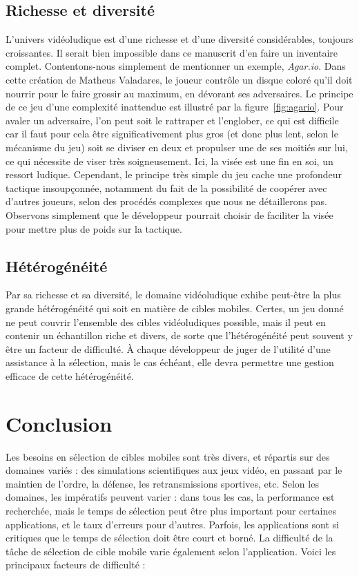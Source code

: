 	\subsection{Richesse et diversité}
	\label{sub:rich}
	L'univers vidéoludique est d'une richesse et d'une diversité considérables, toujours croissantes. Il serait bien impossible dans ce manuscrit d'en faire un inventaire complet. Contentons-nous simplement de mentionner un exemple, \emph{Agar.io}. Dans cette création de Matheus Valadares, le joueur contrôle un disque coloré qu'il doit nourrir pour le faire grossir au maximum, en dévorant ses adversaires. Le principe de ce jeu d'une complexité inattendue est illustré par la figure~\ref{fig:agario}. Pour avaler un adversaire, l'on peut soit le rattraper et l'englober, ce qui est difficile car il faut pour cela être significativement plus gros (et donc plus lent, selon le mécanisme du jeu) soit se diviser en deux et propulser une de ses moitiés sur lui, ce qui nécessite de viser très soigneusement. Ici, la visée est une fin en soi, un ressort ludique. Cependant, le principe très simple du jeu cache une profondeur tactique insoupçonnée, notamment du fait de la possibilité de coopérer avec d'autres joueurs, selon des procédés complexes que nous ne détaillerons pas. Observons simplement que le développeur pourrait choisir de faciliter la visée pour mettre plus de poids sur la tactique.
	
	\subsection{Hétérogénéité}
	Par sa richesse et sa diversité, le domaine vidéoludique exhibe peut-être la plus grande hétérogénéité qui soit en matière de cibles mobiles. Certes, un jeu donné ne peut couvrir l'ensemble des cibles vidéoludiques possible, mais il peut en contenir un échantillon riche et divers, de sorte que l'hétérogénéité peut souvent y être un facteur de difficulté. À chaque développeur de juger de l'utilité d'une assistance à la sélection, mais le cas échéant, elle devra permettre une gestion efficace de cette hétérogénéité. 

	
	\section{Conclusion}    
	Les besoins en sélection de cibles mobiles sont très divers, et répartis sur des domaines variés : des simulations scientifiques aux jeux vidéo, en passant par le maintien de l'ordre, la défense, les retransmissions sportives, etc. Selon les domaines, les impératifs peuvent varier : dans tous les cas, la performance est recherchée, mais le temps de sélection peut être plus important pour certaines applications, et le taux d'erreurs pour d'autres. Parfois, les applications sont si critiques que le temps de sélection doit être court et borné. La difficulté de la tâche de sélection de cible mobile varie également selon l'application. Voici les principaux facteurs de difficulté :
	
